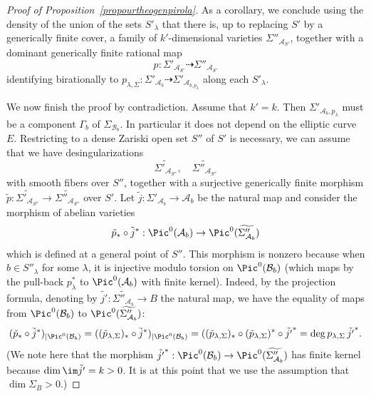 \begin{proof}[Proof of Proposition~\ref{propourtheogenpirola}]
As a corollary, we conclude using the density of the union of the sets $S'_\lambda$ that there is, up to replacing $S'$ by a generically finite cover, a family of $k'$-dimensional varieties $\Sigma''_{\mathcal{A}_{S'}}$, together with a dominant generically finite rational map
\begin{equation}\label{eqpfam}
p: \Sigma'_{\mathcal{A}_{S'}}\dashrightarrow \Sigma''_{\mathcal{A}_{S'}}
\end{equation}
identifying birationally to $p_{\lambda,\Sigma}:\Sigma'_{\mathcal{A}_{b}}\dashrightarrow
\Sigma'_{\mathcal{A}_{b,p_\lambda}}$ along each $S'_\lambda$.

We now finish the proof by contradiction. Assume that $k'=k$. Then $\Sigma'_{\mathcal{A}_b,p_\lambda}$ must be a component $\Gamma_b$ of $\Sigma_{\mathcal{B}_b}$. In particular it does not depend on the elliptic curve $E$. Restricting to a dense Zariski open set $S''$ of $S'$ is necessary, we can assume that we have desingularizations
\begin{equation}\label{eqpfam1}
\widetilde{\Sigma'_{\mathcal{A}_{S''}}},\quad \widetilde{\Sigma''_{\mathcal{A}_{S''}}}
\end{equation}
with smooth fibers over $S''$, together with a surjective generically finite morphism $\tilde{p}:\widetilde{\Sigma'_{\mathcal{A}_{S''}}}\rightarrow \widetilde{\Sigma''_{\mathcal{A}_{S''}}}$ over $S'$. Let $\tilde{j}:\Sigma'_{\mathcal{A}_b}\rightarrow \mathcal{A}_b$ be the natural map and consider the morphism of abelian varieties
\[
\tilde{p}_*\circ \tilde{j}^*:\Pic^0(\mathcal{A}_b)\rightarrow \Pic^0(\widetilde{\Sigma''_{\mathcal{A}_{b}}})
\]
which is defined at a general point of $S''$. This morphism is nonzero because when $b\in S''_\lambda$ for some $\lambda$, it is injective modulo torsion on $\Pic^0(\mathcal{B}_b)$ (which maps by the pull-back $p_\lambda^*$ to $ \Pic^0(\mathcal{A}_b)$ with finite kernel). Indeed, by the projection formula, denoting by $\tilde{j'}:\widetilde{\Sigma''_{\mathcal{A}_{b}}}\rightarrow B$ the natural map, we have the equality of maps from $\Pic^0(\mathcal{B}_b)$ to $\Pic^0(\widetilde{\Sigma''_{\mathcal{A}_{b}}})$:
\[
(\tilde{p}_*\circ \tilde{j}^*)_{\mid \Pic^0(\mathcal{B}_b)}=
((\tilde{p}_{\lambda,\Sigma})_*\circ \tilde{j}^*)_{\mid \Pic^0(\mathcal{B}_b)}=
((\tilde{p}_{\lambda,\Sigma})_*\circ(\tilde{p}_{\lambda,\Sigma})^*\circ \tilde{j'}^*=\deg p_{\lambda,\Sigma} \,\tilde{j'}^*.
\]
(We note here that the morphism $\tilde{j'}^*:\Pic^0(\mathcal{B}_b)\rightarrow\Pic^0(\widetilde{\Sigma''_{\mathcal{A}_{b}}})$ has finite kernel because $\dim \im \tilde{j'}=k>0$. It is at this point that we use the assumption that $\dim \Sigma_B>0$.)


\end{proof}
